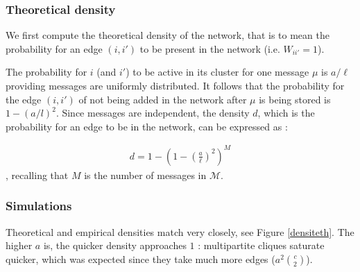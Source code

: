 \documentclass[english,10pt,twocolumn]{IEEEtran}
\theoremstyle{definition}
\begin{document}
	\subsubsection{Theoretical density}
	
	We first compute the theoretical density of the network, that is to mean the probability for an edge $(i, i')$ to be present in the network (i.e. $W_{ii'} = 1$). 
	
	
	
	
	
	
	
	
	

	
	
	The probability for $i$ (and $i'$) to be active in its cluster for one message $\mu$ is $a/\ell$ providing messages are uniformly distributed. It follows that the probability for the edge $(i,i')$ of not being added in the network after $\mu$ is being stored is $1 - \left(a/l\right)^2$. Since messages are independent, the density $d$, which is the probability for an edge to be in the network, can be expressed as :
	
	\begin{align}
		\label{formula_density}
		d = 1 - \left( 1 - \left(\frac{a}{\ell}\right)^2 \right)^M 
	\end{align}		
	, recalling that $M$ is the number of messages in $\mathcal{M}$.	
	
	\subsubsection{Simulations}
	
	Theoretical and empirical densities match very closely, see Figure \ref{densiteth}. %
	The higher $a$ is, the quicker density approaches $1$ : multipartite cliques saturate quicker, which was expected since they take much more edges ($a^2 \binom{c}{2}$).
	
\end{document}
